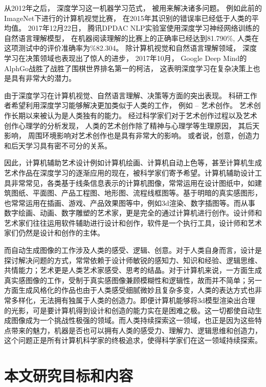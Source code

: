 从2012年之后， 深度学习这一机器学习范式， 被用来解决诸多问题。 例如此前的ImageNet下进行的计算机视觉比赛， 在2015年其识别的错误率已经低于人类的平均值。 2017年12月22日， 腾讯DPDAC NLP实验室使用深度学习神经网络训练的自然语言理解模型， 在机器阅读理解的比赛上的正确率已经达到81.790\%, 人类在这项测试中的评价准确率为\%82.304。 除计算机视觉和自然语言理解领域， 深度学习在决策领域也表现出了惊人的进步， 2017年10月， Google Deep Mind的AlphGo战胜了战胜了围棋世界排名第一的柯洁， 这表明深度学习在复杂决策上也是具有非常大的潜力。 

由于深度学习在计算机视觉、自然语言理解、决策等方面的突出表现。 科研工作者希望利用深度学习能够解决更加类似于人类的工作， 例如 -- 艺术创作。 艺术创作长期以来被认为是人类独有的能力。 经过科学家们对于艺术创作过程以及艺术创作心理学的分析发现， 人类的艺术创作除了精神与心理学等生理原因， 其后天影响， 周围环境影响对艺术创作也是具有非常大的影响。 或者说，创意，创造力和后天学习具有密不可分的关系。 \cite{mq-zhanjian} \cite{adomavicius2005toward} \cite{gil2010state}

因此，计算机辅助艺术设计例如计算机绘画、计算机自动上色等，甚至计算机生成艺术作品在深度学习的逐渐应用的现在，被科学家们寄予希望。计算机辅助设计工具非常常见，各类基于线条信息表示的计算机图像，常常运用在设计图纸中，如建筑图纸、平面图、产品工程图、地形图、流程线框图等。基于明暗的真实感图形，也常常运用在插画、游戏、产品效果图等中，例如3d渲染、数字插图等。而从事数字绘画、动画、数字雕塑的艺术家，更是完全的通过计算机进行创作。设计师和艺术家们往往运用软件辅助进行设计和创作，软件是一个执行工具，设计师和艺术家们仍然是设计和创作的主体。

而自动生成图像的工作涉及人类的感受、逻辑、创意。对于人类自身而言，设计是探讨解决问题的方式，常常依赖于设计师敏锐的感知力、知识和经验、逻辑思维、共情能力；艺术更是人类艺术家感受、思考的结晶。对于计算机来说，一方面生成真实感图像的工作，受制于真实感图像兼顾模糊性和逻辑性，故而并不简单；另一方面生成风格化的作品也由于人类感受细腻微妙且复杂多变，人类的表达方式也非常多样化，无法拥有独属于人类的创造力。即便计算机能够将3d模型渲染出合理的光影，可是要计算机得到设计和创造的能力实在是困难之极。这一切都使自动生成图像成为一个挑战性极强的领域。而人类持续探索这一领域，也正是因为这些特点带来的魅力，机器是否也可以拥有人类的感受力、理解力、逻辑思维和创造力，这个问题正是所有计算机科学家的终极追求，使得科学家们在这一领域持续探索。 



\section{本文研究目标和内容}

